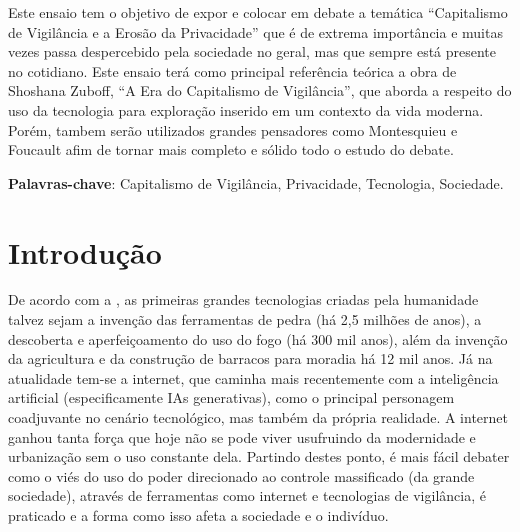 \documentclass[
	12pt,
	openright,
	twoside,
	a4paper,
	english,
	french,
	spanish,
	brazil
]{abntex2}
\begin{document}
  \frenchspacing
  \imprimircapa
  \imprimirfolhaderosto*

  \setlength{\absparsep}{18pt}
  \begin{resumo}
    Este ensaio tem o objetivo de expor e colocar em debate a temática
    ``Capitalismo de Vigilância e a Erosão da Privacidade'' que é de extrema
    importância e muitas vezes passa despercebido pela sociedade no geral, mas
    que sempre está presente no cotidiano. Este ensaio terá como principal
    referência teórica a obra de Shoshana Zuboff, ``A Era do Capitalismo de
    Vigilância'', que aborda a respeito do uso da tecnologia para exploração
    inserido em um contexto da vida moderna. Porém, tambem serão utilizados
    grandes pensadores como Montesquieu e Foucault afim de tornar mais completo
    e sólido todo o estudo do debate.

    \textbf{Palavras-chave}:
      Capitalismo de Vigilância, Privacidade, Tecnologia, Sociedade.
  \end{resumo}


  \textual

  \chapter{Introdução}

  De acordo com a , as primeiras grandes tecnologias
  criadas pela humanidade talvez sejam a invenção das ferramentas de pedra (há
  2,5 milhões de anos), a descoberta e aperfeiçoamento do uso do fogo (há 300
  mil anos), além da invenção da agricultura e da construção de barracos para
  moradia há 12 mil anos. Já na atualidade tem-se a internet, que caminha mais
  recentemente com a inteligência artificial (especificamente IAs generativas),
  como o principal personagem coadjuvante no cenário tecnológico, mas também da
  própria realidade. A internet ganhou tanta força que hoje não se pode viver
  usufruindo da modernidade e urbanização sem o uso constante dela. Partindo
  destes ponto, é mais fácil debater como o viés do uso do poder direcionado ao
  controle massificado (da grande sociedade), através de ferramentas como
  internet e tecnologias de vigilância, é praticado e a forma como isso afeta a
  sociedade e o indivíduo.
\end{document}
